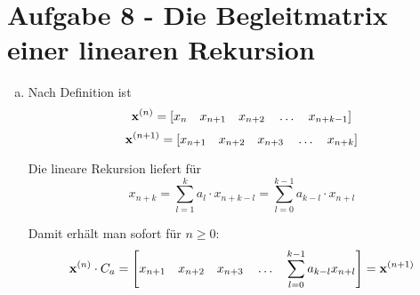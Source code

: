 \section*{Aufgabe 8 - Die Begleitmatrix einer linearen Rekursion}

\begin{enumerate}[(a)]

\item
	Nach Definition ist
	\[ {\bf x}^{(n)} = \left[ x_n \quad x_{n+1} \quad x_{n+2} \quad \ldots \quad x_{n+k-1} \right] \]
	\[ {\bf x}^{(n+1)} =  \left[ x_{n+1} \quad x_{n+2} \quad x_{n+3} \quad \ldots \quad x_{n+k} \right] \]

	Die lineare Rekursion liefert für 
	\[ x_{n+k} = \sum_{l = 1}^{k} a_l \cdot x_{n+k-l} = \sum_{l=0}^{k-1} a_{k-l} \cdot x_{n+l} \]

	Damit erhält man sofort für $n \geq 0$:
	\[ {\bf x}^{(n)} \cdot C_a = \left[  x_{n+1} \quad x_{n+2} \quad
	x_{n+3} \quad \ldots \quad \sum_{l=0}^{k-1} a_{k-l} x_{n+l} \right] =
	{\bf x}^{(n+1)} \]


\end{enumerate}
